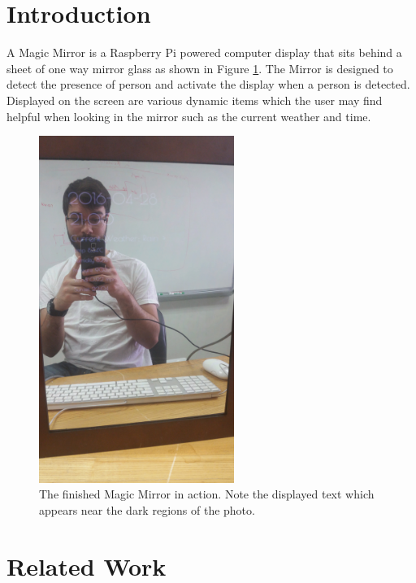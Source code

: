 \documentclass[conference]{IEEEtran}
\begin{document}
\section{Introduction}
A Magic Mirror is a Raspberry Pi powered computer display that sits behind a sheet of one way mirror glass as shown in Figure \ref{fig:mirror}.
The Mirror is designed to detect the presence of person and activate the display when a person is detected.
Displayed on the screen are various dynamic items which the user may find helpful when looking in the mirror such as the current weather and time.
\begin{figure}[!ht]
  \centering
  \includegraphics[width=2.5in, angle=-90]{images/Mirror.jpg}
  \caption{The finished Magic Mirror in action. Note the displayed text which appears near the dark regions of the photo.}
  \label{fig:mirror}
\end{figure}


\section{Related Work}  
\end{document}
